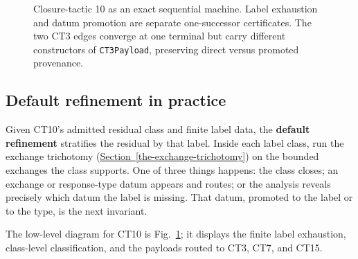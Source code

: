 \documentclass[
  11pt,
]{article}
\theoremstyle{definition}
\newcommand{\secref}[1]{\hyperref[#1]{Section~\ref*{#1}}}
\begin{document}
\begin{figure}[p]
{%
}
\caption[Closure-tactic 10: exact refinement machine]{Closure-tactic 10 as an exact sequential machine.  Label exhaustion and datum promotion are separate one-successor certificates.  The two CT3 edges converge at one terminal but carry different constructors of \texttt{CT3Payload}, preserving direct versus promoted provenance.}
\label{fig:ct10-default-refinement}
\end{figure}
\FloatBarrier


\subsection*{Default refinement in practice}

Given CT10's admitted residual class and finite label data, the
\textbf{default refinement} stratifies the residual by that label. Inside
each label class, run the exchange trichotomy (\secref{the-exchange-trichotomy}) on the bounded
exchanges the class supports. One of three things happens: the class
closes; an exchange or response-type datum appears and routes; or the analysis
reveals precisely which datum the label is missing. That datum, promoted
to the label or to the type, is the next invariant.

The low-level diagram for CT10 is Fig.~\ref{fig:ct10-default-refinement};
it displays the finite label exhaustion, class-level classification,
and the payloads routed to CT3, CT7, and CT15.
\end{document}
